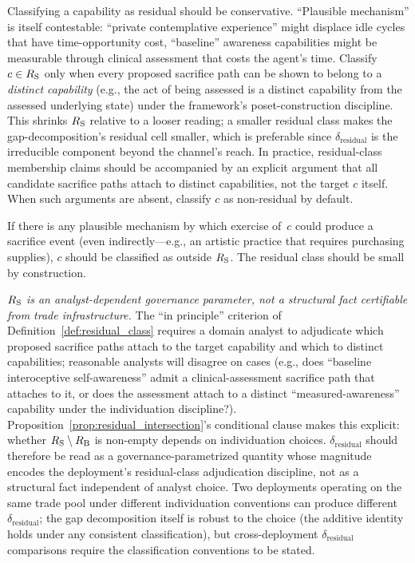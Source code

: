 \begin{remark}
\label{rem:residual_conservatism}
Classifying a capability as residual should be conservative.
``Plausible mechanism'' is itself contestable: ``private
contemplative experience'' might displace idle cycles that have
time-opportunity cost, ``baseline'' awareness capabilities
might be measurable through clinical assessment that costs the
agent's time.  Classify $c \in R_{\mathrm{S}}$ only when every proposed
sacrifice path can be shown to belong to a \emph{distinct
capability} (e.g., the act of being assessed is a distinct
capability from the assessed underlying state) under the
framework's poset-construction discipline.  This shrinks
$R_{\mathrm{S}}$ relative to a looser reading; a smaller residual class
makes the gap-decomposition's residual cell smaller, which is
preferable since $\delta_{\mathrm{residual}}$ is the
irreducible component beyond the channel's reach.  In
practice, residual-class membership claims should be
accompanied by an explicit argument that all candidate
sacrifice paths attach to distinct capabilities, not the
target $c$ itself.  When such arguments are absent, classify
$c$ as non-residual by default.

If there is any plausible mechanism by
which exercise of~$c$ could produce a sacrifice event (even
indirectly---e.g., an artistic practice that requires purchasing
supplies), $c$ should be classified as outside $R_{\mathrm{S}}$.  The
residual class should be small by construction.

\emph{$R_{\mathrm{S}}$ is an analyst-dependent governance parameter,
not a structural fact certifiable from trade infrastructure.}
The ``in principle'' criterion of
Definition~\ref{def:residual_class} requires a domain analyst
to adjudicate which proposed sacrifice paths attach to the
target capability and which to distinct capabilities; reasonable
analysts will disagree on cases (e.g., does ``baseline
interoceptive self-awareness'' admit a clinical-assessment
sacrifice path that attaches to it, or does the assessment
attach to a distinct ``measured-awareness'' capability under
the individuation discipline?).  Proposition~\ref{prop:residual_intersection}'s
conditional clause makes this explicit: whether
$R_{\mathrm{S}} \setminus R_{\mathrm{B}}$ is non-empty depends on individuation
choices.  $\delta_{\mathrm{residual}}$ should therefore be
read as a governance-parametrized quantity whose magnitude
encodes the deployment's residual-class adjudication
discipline, not as a structural fact independent of analyst
choice.  Two deployments operating on the same trade pool
under different individuation conventions can produce
different $\delta_{\mathrm{residual}}$; the gap decomposition
itself is robust to the choice (the additive identity holds
under any consistent classification), but cross-deployment
$\delta_{\mathrm{residual}}$ comparisons require the
classification conventions to be stated.
\end{remark}

